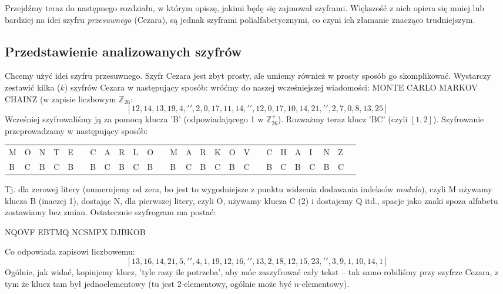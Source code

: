 \documentclass[a4paper]{article}
\theoremstyle{defn}
\theoremstyle{theorem}
\theoremstyle{lemma}
\theoremstyle{cor}
\theoremstyle{fact}
\begin{document}
Przejdźmy teraz do następnego rozdziału, w którym opiszę, jakimi będę się zajmował szyframi. Większość z nich opiera się mniej lub bardziej na idei szyfru \textit{przesuwnego} (Cezara), są jednak szyframi polialfabetycznymi, co czyni ich złamanie znacząco trudniejszym.\\

\subsection{Przedstawienie analizowanych szyfrów}
Chcemy użyć idei szyfru przesuwnego. Szyfr Cezara jest zbyt prosty, ale umiemy również w prosty sposób go skomplikować. Wystarczy zestawić kilka ($k$) szyfrów Cezara w następujący sposób:
wróćmy do naszej wcześniejszej wiadomości: MONTE CARLO MARKOV CHAINZ (w zapisie liczbowym $\mathbb{Z}_{26}$:
$$[12, 14, 13, 19, 4, ' ', 2, 0, 17, 11, 14, ' ', 12, 0, 17, 10, 14, 21, ' ', 2, 7, 0, 8, 13, 25]$$
Wcześniej szyfrowaliśmy ją za pomocą klucza 'B' (odpowiadającego 1 w $\mathbb{Z}_{26}^+$). Rozważmy teraz klucz 'BC' (czyli $[1, 2]$). Szyfrowanie przeprowadzamy w następujący sposób:
\begin{center}\begin{tabular}{|p{1.5mm}|p{1.5mm}|p{1.5mm}|p{1.5mm}|p{1.5mm}|p{1.5mm}|p{1.5mm}|p{1.5mm}|p{1.5mm}|p{1.5mm}|p{1.5mm}|p{1.5mm}|p{1.5mm}|p{1.5mm}|p{1.5mm}|p{1.5mm}|p{1.5mm}|p{1.5mm}|p{1.5mm}|p{1.5mm}|p{1.5mm}|p{1.5mm}|p{1.5mm}|p{1.5mm}|p{1.5mm}|p{1.5mm}|}
    M & O & N & T & E & & C & A & R & L & O & & M & A & R & K & O & V & & C & H & A & I & N & Z \\
    B & C & B & C & B & & B & C & B & C & B & & B & C & B & C & B & C & & B & C & B & C & B & C
\end{tabular}
\end{center}
Tj. dla zerowej litery (numerujemy od zera, bo jest to wygodniejsze z punktu widzenia dodawania indeksów \textit{modulo}), czyli M używamy klucza B (inaczej 1), dostając N, dla pierwszej litery, czyli O, używamy klucza C (2) i dostajemy Q itd., spacje jako znaki spoza alfabetu zostawiamy bez zmian. Ostatecznie szyfrogram ma postać:
\begin{center}
    NQOVF EBTMQ NCSMPX DJBKOB
\end{center}
Co odpowiada zapisowi liczbowemu:
$$ [13, 16, 14, 21, 5, ' ', 4, 1, 19, 12, 16, ' ', 13, 2, 18, 12, 15, 23, ' ', 3, 9, 1, 10, 14, 1]$$
Ogólnie, jak widać, kopiujemy klucz, 'tyle razy ile potrzeba', aby móc zaszyfrować cały tekst – tak samo robiliśmy przy szyfrze Cezara, z tym że klucz tam był jednoelementowy (tu jest 2-elementowy, ogólnie może być $n$-elementowy).\\\\
\end{document}
